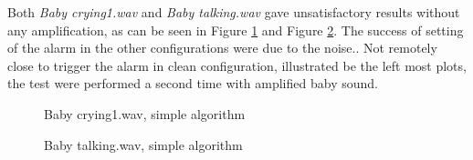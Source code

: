 Both \emph{Baby crying1.wav} and \emph{Baby talking.wav} gave unsatisfactory results without any amplification, as 
can be seen in Figure \ref{fig:bc2_simp} and Figure \ref{fig:bt_simp}. The success of setting of the alarm in the other configurations
were due to the noise.. Not remotely close to trigger the alarm in clean configuration, illustrated be the left most plots, 
the test were performed a second time with amplified baby sound.

\begin{figure}[H]
  \centering
  \caption{Baby crying1.wav, simple algorithm}
  \label{fig:bc2_simp}
\end{figure}
\begin{figure}[H]
  \centering
  \caption{Baby talking.wav, simple algorithm}
  \label{fig:bt_simp}
\end{figure}

